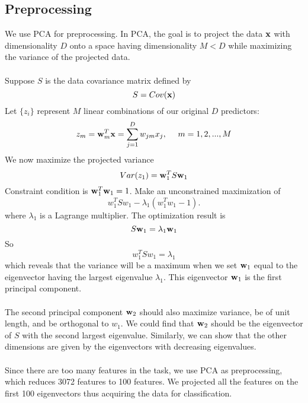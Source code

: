 \documentclass[a4paper]{article}
\newcommand{\vw}{{\bf w}}
\newcommand{\vx}{{\bf x}}
\begin{document}
\subsection{Preprocessing}
We use PCA for preprocessing. In PCA, the goal is to project the data $\vx$ with dimensionality $D$ onto a space having dimensionality $M <D$ while  maximizing the variance of the projected data.\\
\\
Suppose $S$ is the data covariance matrix defined by\begin{equation}
S=Cov(\vx)
\end{equation}
Let $\{z_i\}$ represent $M$ linear combinations of our original $D$ predictors:
\begin{equation}
z_m=\vw_m^T\vx=\sum_{j=1}^D w_{jm} x_j,~~~~m=1,2,...,M
\end{equation}
We now maximize the projected variance \begin{equation}
Var(z_1)=\vw^T_1S\vw_1
\end{equation}  
Constraint condition is $\vw^T_1\vw_1=1$. Make an unconstrained maximization of
\begin{equation}
w^T_1Sw_1-\lambda_1(w_1^T w_1-1).
\end{equation}
where $\lambda_1$ is a Lagrange multiplier. The optimization result is \begin{equation} 
S\vw_1 = \lambda_1\vw_1
\end{equation}
So\begin{equation}
w_1^TSw_1 = \lambda_1
\end{equation}
which reveals that the variance will be a maximum when we set $\vw_1$ equal to the eigenvector having the largest eigenvalue $\lambda_1$. This eigenvector $\vw_1$ is the first principal component.\\
\\
The second principal component $\vw_2$ should also maximize variance, be of unit length, and be orthogonal to $w_1$. We could find that $\vw_2$ should be the eigenvector of $S$ with the second largest eigenvalue. Similarly, we can show that the other dimensions are given by the eigenvectors with decreasing eigenvalues.\\
\\
Since there are too many features in the task, we use PCA as preprocessing, which reduces 3072 features to 100 features. We projected all the features on the first 100 eigenvectors thus acquiring the data for classification.
\end{document}
